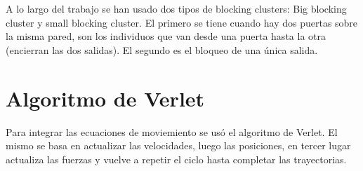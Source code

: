 A lo largo del trabajo se han usado dos tipos de blocking clusters: Big blocking cluster y small blocking cluster. El primero se tiene cuando hay dos puertas sobre la misma pared, son los individuos que van desde una puerta hasta la otra (encierran las dos salidas). El segundo es el bloqueo de una única salida. 

\section{Algoritmo de Verlet}

Para integrar las ecuaciones de moviemiento se usó el algoritmo de Verlet. El mismo se basa en actualizar las velocidades, luego las posiciones, en tercer lugar actualiza las fuerzas y vuelve a repetir el ciclo hasta completar las trayectorias. 



